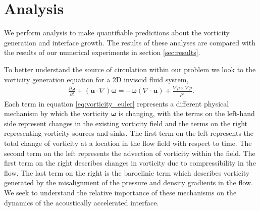 \section{Analysis}%
\label{sec:analysis}%
We perform analysis to make quantifiable predictions about the
vorticity generation and interface growth. The results of these
analyses are compared with the results of our numerical experiments in
section \ref{sec:results}.

To better understand the source of circulation within our problem we
look to the vorticity generation equation for a 2D inviscid fluid
system,
\begin{align} \label{eq:vorticity_euler}
  \frac{\partial \boldsymbol{\omega}}{\partial t}+\left(\boldsymbol{u}\cdot\nabla\right)\boldsymbol{\omega} =%
  - \boldsymbol{\omega}\left(\nabla\cdot\boldsymbol{u}\right) + \frac{\nabla\rho\times\nabla p}{\rho^2}.%
\end{align}
Each term in equation \eqref{eq:vorticity_euler} represents a
different physical mechanism by which the vorticity $\boldsymbol{\omega}$ is
changing, with the terms on the left-hand side represent changes in
the existing vorticity field and the terms on the right representing
vorticity sources and sinks. The first term on the left represents the
total change of vorticity at a location in the flow field with respect
to time. The second term on the left represents the advection of
vorticity within the field. The first term on the right describes
changes in vorticity due to compressibility in the flow. The last term
on the right is the baroclinic term which describes vorticity
generated by the misalignment of the pressure and density gradients in
the flow. We seek to understand the relative importance of these
mechanisms on the dynamics of the acoustically accelerated interface.

